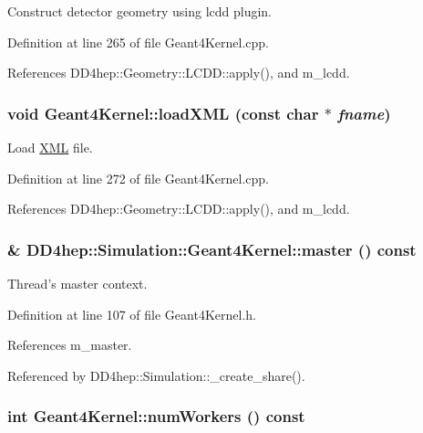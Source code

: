 Construct detector geometry using lcdd plugin. 

Definition at line 265 of file Geant4Kernel.cpp.

References DD4hep::Geometry::LCDD::apply(), and m\_\-lcdd.\hypertarget{class_d_d4hep_1_1_simulation_1_1_geant4_kernel_aaaab733198f5e548e23c5b97dfd0aa32}{
\subsubsection[{loadXML}]{\setlength{\rightskip}{0pt plus 5cm}void Geant4Kernel::loadXML (const char $\ast$ {\em fname})}}
\label{class_d_d4hep_1_1_simulation_1_1_geant4_kernel_aaaab733198f5e548e23c5b97dfd0aa32}


Load \hyperlink{namespace_d_d4hep_1_1_x_m_l}{XML} file. 

Definition at line 272 of file Geant4Kernel.cpp.

References DD4hep::Geometry::LCDD::apply(), and m\_\-lcdd.\hypertarget{class_d_d4hep_1_1_simulation_1_1_geant4_kernel_a38ec8e1c3c5469aceaf178973386ddfc}{
\subsubsection[{master}]{\& DD4hep::Simulation::Geant4Kernel::master () const}}
\label{class_d_d4hep_1_1_simulation_1_1_geant4_kernel_a38ec8e1c3c5469aceaf178973386ddfc}


Thread's master context. 

Definition at line 107 of file Geant4Kernel.h.

References m\_\-master.

Referenced by DD4hep::Simulation::\_\-create\_\-share().\hypertarget{class_d_d4hep_1_1_simulation_1_1_geant4_kernel_ad3f634c51b845742578eaae0933cf3ef}{
\subsubsection[{numWorkers}]{\setlength{\rightskip}{0pt plus 5cm}int Geant4Kernel::numWorkers () const}}
\label{class_d_d4hep_1_1_simulation_1_1_geant4_kernel_ad3f634c51b845742578eaae0933cf3ef}



